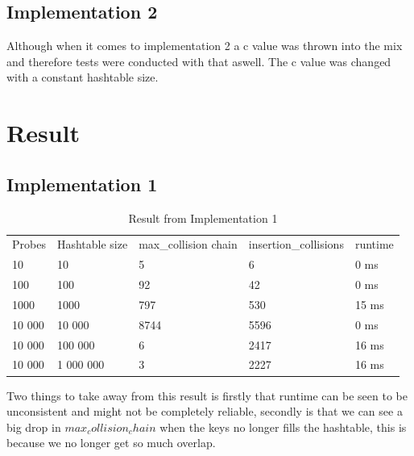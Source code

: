 \documentclass[paper=a4, fontsize=11pt]{scrartcl}
\numberwithin{equation}{section}		%
\numberwithin{figure}{section}			%
\numberwithin{table}{section}				%
\begin{document}
\subsection{Implementation 2}
Although when it comes to implementation 2 a c value was thrown into the mix and therefore tests were conducted with that aswell. The c value was changed with a constant hashtable size.
 
\section{Result}
\subsection{Implementation 1}
\begin{table}[]
\centering
\caption{Result from Implementation 1 }
\label{impl1_table}
\begin{tabular}{lllll}
Probes & Hashtable size & max\_collision chain & insertion\_collisions & runtime \\
10     & 10             & 5                   & 6                     & 0 ms    \\
100    & 100            & 92                  & 42                    & 0 ms    \\
1000   & 1000           & 797                 & 530                   & 15 ms   \\
10 000  & 10 000         & 8744                & 5596                  & 0 ms    \\
10 000  & 100 000        & 6                   & 2417                  & 16 ms   \\
10 000  & 1 000 000      & 3                   & 2227                  & 16 ms  
\end{tabular}
\end{table}
Two things to take away from this result is firstly that runtime can be seen to be unconsistent and might not be completely reliable, secondly is that we can see a big drop in $max_collision_chain$ when the keys no longer fills the hashtable, this is because we no longer get so much overlap.
\end{document}
